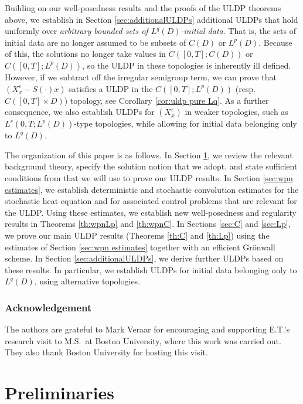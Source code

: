 \documentclass[10pt,a4paper]{amsart}
\numberwithin{equation}{section}
\newcommand{\eps}{\varepsilon}
\begin{document}
Building on our well-posedness results and the proofs of the ULDP theorems above, we establish in Section \ref{sec:additionalULDPs} additional ULDPs that hold  uniformly over \emph{arbitrary  bounded sets of $L^q(D)$-initial data}. That is, the sets of initial data are no longer assumed to be subsets of  $C(D)$ or $L^p(D)$. Because of this, the solutions no longer take  values in  $C([0,T];C(D))$ or $C([0,T];L^p(D))$, so the ULDP in these topologies is inherently ill defined. However, if we subtract off the irregular semigroup term, we can prove that $(X^\eps_x - S(\cdot)x)$ satisfies a ULDP in the $C([0,T];L^p(D))$ (resp.\ $C([0,T]\times D)$) topology, see Corollary \ref{cor:uldp pure Lq}. As a further consequence,  
we also establish ULDPs for $(X^\eps_x)$ in weaker topologies, such as  $L^{r}( 0,T;L^p(D))$-type topologies, while allowing for initial data belonging only to $L^q(D)$. 


The organization of this paper is as follows. 
In Section \ref{sec:prelims}, we review the relevant background theory, specify the solution notion that we adopt, and state  sufficient conditions from \cite{Salins19equivalences} that we will use to prove our ULDP results. 
In Section \ref{sec:wpn estimates}, we establish deterministic and stochastic convolution estimates for the stochastic heat equation and for associated control problems that are relevant for the ULDP. Using these estimates, we establish new well-posedness and regularity results in Theorems \ref{th:wpnLp} and \ref{th:wpnC}.   
In Sections \ref{sec:C} and \ref{sec:Lp}, we prove our main ULDP results (Theorems \ref{th:C} and \ref{th:Lp}) using the estimates of Section \ref{sec:wpn estimates} together with an efficient Gr\"onwall scheme. In Section \ref{sec:additionalULDPs}, we derive further ULDPs based on these results. In particular, we establish ULDPs for initial data belonging only to $L^q(D)$, using alternative topologies. 


\subsubsection*{Acknowledgement}
The authors are grateful to Mark Veraar for encouraging and supporting E.T.'s research visit to M.S.\ at Boston University, where this work was carried out. They also thank Boston University for hosting this visit.  

\section{Preliminaries}\label{sec:prelims}
\end{document}
